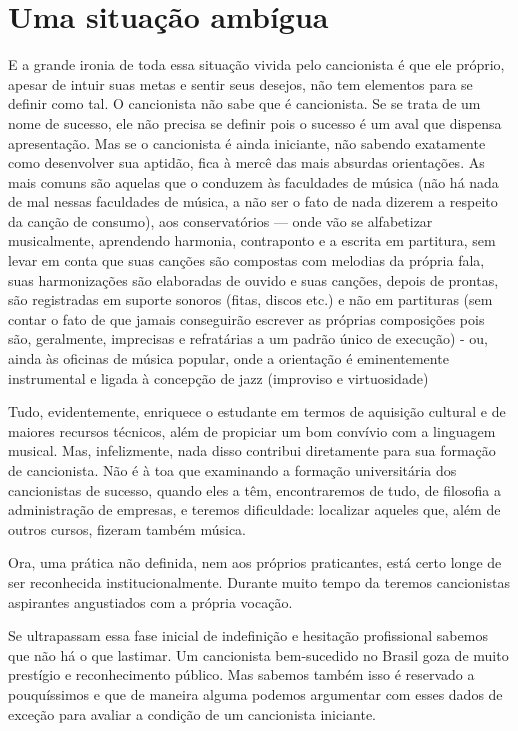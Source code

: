 \section{Uma situação ambígua}

E a grande ironia de toda essa situação vivida pelo cancionista é que
ele próprio, apesar de intuir suas metas e sentir seus desejos, não tem
elementos para se definir como tal. O cancionista não sabe que é
cancionista. Se se trata de um nome de sucesso, ele não precisa se
definir pois o sucesso é um aval que dispensa apresentação. Mas se o
cancionista é ainda iniciante, não sabendo exatamente como desenvolver
sua aptidão, fica à mercê das mais absurdas orientações. As mais comuns
são aquelas que o conduzem às faculdades de música (não há nada de mal
nessas faculdades de música, a não ser o fato de nada dizerem a respeito
da canção de consumo), aos conservatórios --- onde vão se alfabetizar
musicalmente, aprendendo harmonia, contraponto e a escrita em partitura,
sem levar em conta que suas canções são compostas com melodias da
própria fala, suas harmonizações são elaboradas de ouvido e suas
canções, depois de prontas, são registradas em suporte sonoros (fitas,
discos etc.) e não em partituras (sem contar o fato de que jamais
conseguirão escrever as próprias composições pois são, geralmente,
imprecisas e refratárias a um padrão único de execução) - ou, ainda às
oficinas de música popular, onde a orientação é eminentemente
instrumental e ligada à concepção de jazz (improviso e virtuosidade)

Tudo, evidentemente, enriquece o estudante em termos de aquisição
cultural e de maiores recursos técnicos, além de propiciar um bom
convívio com a linguagem musical. Mas, infelizmente, nada disso
contribui diretamente para sua formação de cancionista. Não é à toa que
examinando a formação universitária dos cancionistas de sucesso, quando
eles a têm, encontraremos de tudo, de filosofia a administração de
empresas, e teremos dificuldade: localizar aqueles que, além de outros
cursos, fizeram também música.

Ora, uma prática não definida, nem aos próprios praticantes, está certo
longe de ser reconhecida institucionalmente. Durante muito tempo da
teremos cancionistas aspirantes angustiados com a própria vocação.

Se ultrapassam essa fase inicial de indefinição e hesitação profissional
sabemos que não há o que lastimar. Um cancionista bem-sucedido no Brasil
goza de muito prestígio e reconhecimento público. Mas sabemos também
isso é reservado a pouquíssimos e que de maneira alguma podemos
argumentar com esses dados de exceção para avaliar a condição de um
cancionista iniciante.

